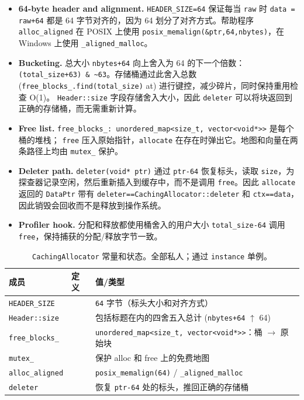 \begin{itemize}[leftmargin=1.2em]
\item \textbf{64-byte header and alignment.} \texttt{HEADER\_SIZE=64} 保证每当 \texttt{raw} 时 \texttt{data = raw+64} 都是 64 字节对齐的，因为 64 划分了对齐方式。帮助程序 \texttt{alloc\_aligned} 在 POSIX 上使用 \texttt{posix\_memalign(\&ptr,64,nbytes)}，在 Windows 上使用 \texttt{\_aligned\_malloc}。
\item \textbf{Bucketing.} 总大小 \texttt{nbytes+64} 向上舍入为 64 的下一个倍数：\texttt{(total\_size+63) \& \~{}63}。存储桶通过此舍入总数 (\texttt{free\_blocks\_.find(total\_size)} at) 进行键控，减少碎片，同时保持重用检查 O(1)。 \texttt{Header::size} 字段存储舍入大小，因此 \texttt{deleter} 可以将块返回到正确的存储桶，而无需重新计算。
\item \textbf{Free list.} \texttt{free\_blocks\_: unordered\_map<size\_t, vector<void*>>} 是每个桶的堆栈； \texttt{free} 压入原始指针，\texttt{allocate} 在存在时弹出它。地图和向量在两条路径上均由 \texttt{mutex\_} 保护。
\item \textbf{Deleter path.} \texttt{deleter(void* ptr)} 通过 \texttt{ptr-64} 恢复标头，读取 \texttt{size}，为探查器记录空闲，然后重新插入到缓存中，而不是调用 \texttt{free}。因此 \texttt{allocate} 返回的 \texttt{DataPtr} 带有 \texttt{deleter==CachingAllocator::deleter} 和 \texttt{ctx==data}，因此销毁会回收而不是释放到操作系统。
\item \textbf{Profiler hook.} 分配和释放都使用桶舍入的用户大小 \texttt{total\_size-64} 调用 \texttt{free}，保持捕获的分配/释放字节一致。
\end{itemize}

\begin{table}[H]
\centering
\caption{\texttt{CachingAllocator} 常量和状态。全部私人；通过 \texttt{instance} 单例。}
\label{tab:cachingconst}
\small
\begin{tabular}{lll}
\toprule
成员 & 定义 & 值/类型 \\
\midrule
\texttt{HEADER\_SIZE} &  & \texttt{64} 字节（标头大小和对齐方式） \\
\texttt{Header::size} &  & 包括标题在内的四舍五入总计 (\texttt{nbytes+64} $\uparrow$ 64) \\
\texttt{free\_blocks\_} &  & \texttt{unordered\_map<size\_t, vector<void*>>}：桶 $\rightarrow$ 原始块 \\
\texttt{mutex\_} &  & 保护 alloc 和 free 上的免费地图 \\
\texttt{alloc\_aligned} &  & \texttt{posix\_memalign(64)} / \texttt{\_aligned\_malloc} \\
\texttt{deleter} &  & 恢复 \texttt{ptr-64} 处的标头，推回正确的存储桶 \\
\bottomrule
\end{tabular}
\end{table}

